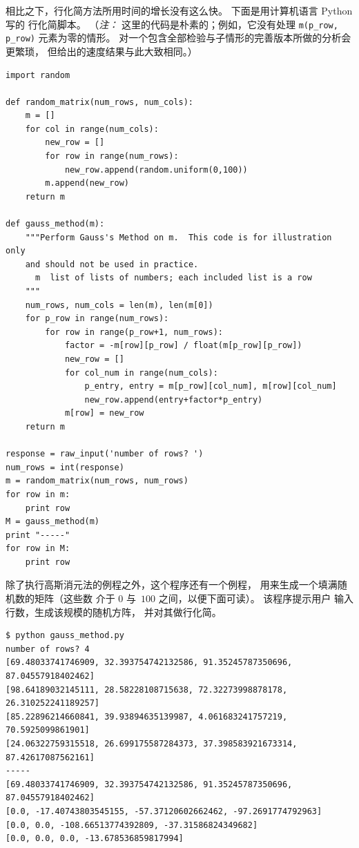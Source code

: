 相比之下，行化简方法所用时间的增长没有这么快。
下面是用计算机语言 Python 写的
行化简脚本。
（\textit{注：}
这里的代码是朴素的；例如，它没有处理
\lstinline[style=inline]!m(p_row, p_row)! 元素为零的情形。
对一个包含全部检验与子情形的完善版本所做的分析会更繁琐，
但给出的速度结果与此大致相同。）
\begin{lstlisting}
import random

def random_matrix(num_rows, num_cols):
    m = []
    for col in range(num_cols):
        new_row = []
        for row in range(num_rows):
            new_row.append(random.uniform(0,100))
        m.append(new_row)
    return m

def gauss_method(m):
    """Perform Gauss's Method on m.  This code is for illustration only
    and should not be used in practice.
      m  list of lists of numbers; each included list is a row
    """
    num_rows, num_cols = len(m), len(m[0])
    for p_row in range(num_rows):
        for row in range(p_row+1, num_rows):
            factor = -m[row][p_row] / float(m[p_row][p_row])
            new_row = []
            for col_num in range(num_cols):
                p_entry, entry = m[p_row][col_num], m[row][col_num]
                new_row.append(entry+factor*p_entry)
            m[row] = new_row
    return m

response = raw_input('number of rows? ')
num_rows = int(response)
m = random_matrix(num_rows, num_rows)
for row in m:
    print row
M = gauss_method(m)
print "-----"
for row in M:
    print row
\end{lstlisting}
除了执行高斯消元法的例程之外，这个程序还有一个例程，
用来生成一个填满随机数的矩阵（这些数
介于 $0$ 与~$100$ 之间，以便下面可读）。
该程序提示用户
输入行数，生成该规模的随机方阵，
并对其做行化简。
\begin{lstlisting}
$ python gauss_method.py
number of rows? 4
[69.48033741746909, 32.393754742132586, 91.35245787350696, 87.04557918402462]
[98.64189032145111, 28.58228108715638, 72.32273998878178, 26.310252241189257]
[85.22896214660841, 39.93894635139987, 4.061683241757219, 70.5925099861901]
[24.06322759315518, 26.699175587284373, 37.398583921673314, 87.42617087562161]
-----
[69.48033741746909, 32.393754742132586, 91.35245787350696, 87.04557918402462]
[0.0, -17.40743803545155, -57.37120602662462, -97.2691774792963]
[0.0, 0.0, -108.66513774392809, -37.31586824349682]
[0.0, 0.0, 0.0, -13.678536859817994]
\end{lstlisting}  %

